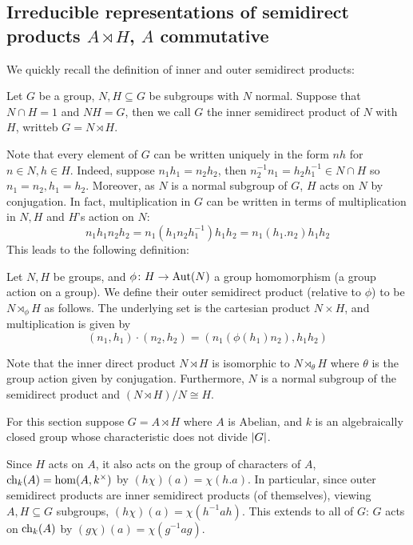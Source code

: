 \eproof

\subsection{Irreducible representations of semidirect products $A\rtimes H$, $A$ commutative}

We quickly recall the definition of inner and outer semidirect products:

\bdefn

    Let $G$ be a group, $N,H\subseteq G$ be subgroups with $N$ normal.
    Suppose that $N\cap H=1$ and $NH=G$, then we call $G$ the {\emphcolor inner semidirect product} of $N$ with $H$, writteb $G=N\rtimes H$.

\edefn

Note that every element of $G$ can be written uniquely in the form $nh$ for $n\in N,h\in H$.
Indeed, suppose $n_1h_1=n_2h_2$, then $n_2^{-1}n_1=h_2h_1^{-1}\in N\cap H$ so $n_1=n_2,h_1=h_2$.
Moreover, as $N$ is a normal subgroup of $G$, $H$ acts on $N$ by conjugation.
In fact, multiplication in $G$ can be written in terms of multiplication in $N,H$ and $H$'s action on $N$:
$$ n_1h_1n_2h_2 = n_1(h_1n_2h_1^{-1})h_1h_2 = n_1(h_1.n_2)h_1h_2 $$
This leads to the following definition:

\bdefn

    Let $N,H$ be groups, and $\phi\colon H\to{\rm Aut}(N)$ a group homomorphism (a group action on a group).
    We define their {\emphcolor outer semidirect product} (relative to $\phi$) to be $N\rtimes_\phi H$ as follows.
    The underlying set is the cartesian product $N\times H$, and multiplication is given by
    $$ (n_1,h_1)\cdot(n_2,h_2) = (n_1(\phi(h_1)n_2),h_1h_2) $$

\edefn

Note that the inner direct product $N\rtimes H$ is isomorphic to $N\rtimes_\theta H$ where $\theta$ is the group action given by conjugation.
Furthermore, $N$ is a normal subgroup of the semidirect product and $(N\rtimes H)/N\cong H$.

For this section suppose $G=A\rtimes H$ where $A$ is Abelian, and $k$ is an algebraically closed group whose characteristic does not divide $\mathopen{}\mathclose{\left|G\right|}$.

Since $H$ acts on $A$, it also acts on the group of characters of $A$, ${\rm ch}_k(A)=\hom(A,k^\times)$ by $(h\chi)(a)=\chi(h.a)$.
In particular, since outer semidirect products are inner semidirect products (of themselves), viewing $A,H\subseteq G$ subgroups, $(h\chi)(a)=\chi(h^{-1}ah)$.
This extends to all of $G$: $G$ acts on ${\rm ch}_k(A)$ by $(g\chi)(a)=\chi(g^{-1}ag)$.

